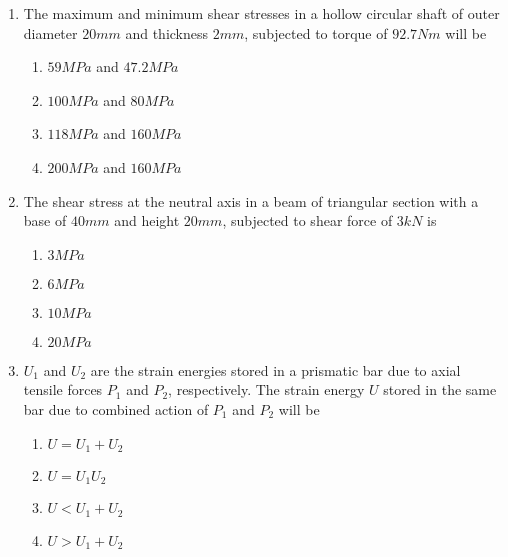 \documentclass[journal,12pt,onecolumn]{IEEEtran}
\theoremstyle{remark}
\begin{document}
\begin{enumerate}
\hfill{}
\begin{enumerate}
\end{enumerate}

\item The maximum and minimum shear stresses in a hollow circular shaft of outer diameter $20mm$ and thickness $2mm$, subjected to torque of $92.7Nm$ will be

\hfill{}
\begin{enumerate}
\item $59MPa$ and $47.2MPa$
\item $100MPa$ and $80MPa$
\item $118MPa$ and $160MPa$
\item $200MPa$ and $160MPa$
\end{enumerate}

\item The shear stress at the neutral axis in a beam of triangular section with a base of $40mm$ and height $20mm$, subjected to shear force of $3kN$ is

\hfill{}
\begin{enumerate}
\item $3MPa$
\item $6MPa$
\item $10MPa$
\item $20MPa$
\end{enumerate}

\item $U_1$ and $U_2$ are the strain energies stored in a prismatic bar due to axial tensile forces $P_1$ and $P_2$, respectively. The strain energy $U$ stored in the same bar due to combined action of $P_1$ and $P_2$ will be

\hfill{}
\begin{enumerate}
\item $U=U_1+U_2$
\item $U=U_1U_2$
\item $U<U_1+U_2$
\item $U>U_1+U_2$
\end{enumerate}

\end{enumerate}
\end{document}
